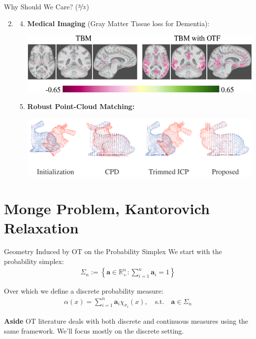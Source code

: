 \documentclass{beamer}
\begin{document}
\begin{frame}{Why Should We Care? ($\nicefrac{3}{3}$)}
	\begin{enumerate}[label=\arabic*.]
		\setcounter{enumi}{1}
		\item
			\begin{enumerate}[label=\alph*.]
			\setcounter{enumii}{3}
				\item \textbf{Medical Imaging} (Gray Matter Tissue loss for Dementia):
					\begin{center}
						\includegraphics[width=.8\textwidth]{img/ctscan.jpg}
					\end{center} \pause
					\vspace{1.5em}
				\item \bf Robust Point-Cloud Matching:
					\begin{center}
						\includegraphics[width=.8\textwidth]{img/pcm.png}
					\end{center}
			\end{enumerate}
	\end{enumerate}
\end{frame}

\section{Monge Problem, Kantorovich Relaxation}

\begin{frame}{Geometry Induced by OT on the Probability Simplex}
	We start with the probability simplex:
	\begin{gather}
		\Sigma_n := \left\{ \bm{a} \in \mathbb{R}^n_+ : \sum^n_{i=1} \bm{a}_i = 1 \right\}
	\end{gather} \pause

	Over which we define a discrete probability measure:
	\begin{gather}
		\alpha(x) = \sum^n_{i=1} \bm{a}_i \chi_{x_i}(x), \quad \text{s.t.} \quad \bm{a} \in \Sigma_n
	\end{gather} \pause

	\begin{block}{\bf Aside}
		OT literature deals with both discrete and continuous measures using the same framework. We'll focus mostly on the discrete setting.
	\end{block}
\end{frame}
\end{document}

